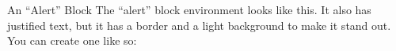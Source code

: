 \begin{alertblock}{An ``Alert'' Block}
The ``alert'' block environment looks like this. It also has justified text, but it has a border and a light background to make it stand out. You can create one like so:
\end{alertblock}